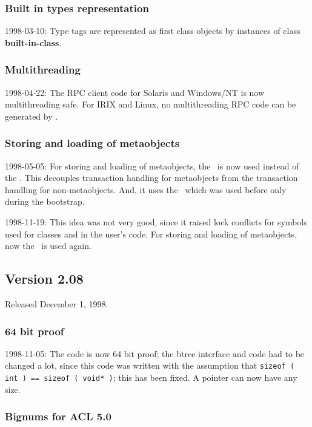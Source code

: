 \subsubsection{Built in types representation}

1998-03-10: Type tags are represented as first class objects by
instances of class \textbf{built-in-class}.

\subsubsection{Multithreading}

1998-04-22: The RPC client code for Solaris and Windows/NT is now
multithreading safe. For IRIX and Linux, no multithreading RPC code
can be generated by .

\subsubsection{Storing and loading of metaobjects}

1998-05-05: For storing and loading of metaobjects, the
\ is now used instead of the
. This decouples transaction handling
for metaobjects from the transaction handling for
non-metaobjects. And, it uses the \ which
was used before only during the bootstrap.

1998-11-19: This idea was not very good, since it raised lock
conflicts for symbols used for classes and in the user's code.  For
storing and loading of metaobjects, now the
\ is used again.

\subsection{Version 2.08}

Released December 1, 1998.

\subsubsection{64 bit proof}

1998-11-05: The code is now 64 bit proof; the btree interface and code
had to be changed a lot, since this code was written with the
assumption that \texttt{sizeof ( int )}\ \texttt{==}\ \texttt{sizeof (
  void* )}; this has been fixed. A pointer can now have any size.

\subsubsection{Bignums for ACL 5.0}

